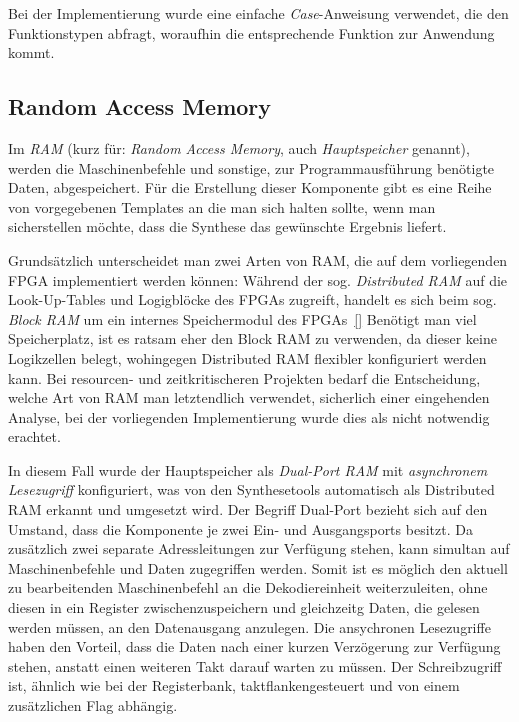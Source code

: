Bei der Implementierung wurde eine einfache \textit{Case}-Anweisung verwendet, die den Funktionstypen abfragt, woraufhin die entsprechende Funktion zur Anwendung kommt.

\subsection{Random Access Memory}
\label{subsec:RAM}

Im \textit{RAM} (kurz für: \textit{Random Access Memory}, auch \textit{Hauptspeicher} genannt), werden die Maschinenbefehle und sonstige, zur Programmausführung benötigte Daten, abgespeichert.
Für die Erstellung dieser Komponente gibt es eine Reihe von vorgegebenen Templates an die man sich halten sollte, wenn man sicherstellen möchte, dass die Synthese das gewünschte Ergebnis liefert.~\cite[S. 243 ff.]{Chu}

Grundsätzlich unterscheidet man zwei Arten von RAM, die auf dem vorliegenden FPGA implementiert werden können:
Während der sog. \textit{Distributed RAM} auf die Look-Up-Tables und Logigblöcke des FPGAs zugreift, handelt es sich beim sog. \textit{Block RAM} um ein internes Speichermodul des FPGAs~\ref{}
Benötigt man viel Speicherplatz, ist es ratsam eher den Block RAM zu verwenden, da dieser keine Logikzellen belegt, wohingegen Distributed RAM flexibler konfiguriert werden kann.
Bei resourcen- und zeitkritischeren Projekten bedarf die Entscheidung, welche Art von RAM man letztendlich verwendet, sicherlich einer eingehenden Analyse, bei der vorliegenden Implementierung wurde dies als nicht notwendig erachtet.


In diesem Fall wurde der Hauptspeicher als \textit{Dual-Port RAM} mit \textit{asynchronem Lesezugriff} konfiguriert, was von den Synthesetools automatisch als Distributed RAM erkannt und umgesetzt wird.
Der Begriff Dual-Port bezieht sich auf den Umstand, dass die Komponente je zwei Ein- und Ausgangsports besitzt.
Da zusätzlich zwei separate Adressleitungen zur Verfügung stehen, kann simultan auf Maschinenbefehle und Daten zugegriffen werden.
Somit ist es möglich den aktuell zu bearbeitenden Maschinenbefehl an die Dekodiereinheit weiterzuleiten, ohne diesen in ein Register zwischenzuspeichern und gleichzeitg Daten, die gelesen werden müssen, an den Datenausgang anzulegen.
Die ansychronen Lesezugriffe haben den Vorteil, dass die Daten nach einer kurzen Verzögerung zur Verfügung stehen, anstatt einen weiteren Takt darauf warten zu müssen.
Der Schreibzugriff ist, ähnlich wie bei der Registerbank, taktflankengesteuert und von einem zusätzlichen Flag abhängig.

